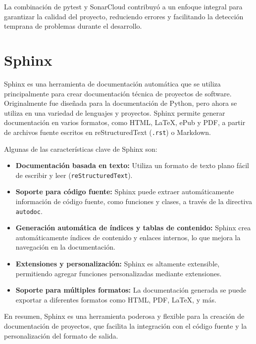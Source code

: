 La combinación de pytest y SonarCloud contribuyó a un enfoque integral para garantizar la calidad del proyecto, reduciendo errores y facilitando la detección temprana de problemas durante el desarrollo.

\section*{Sphinx}

Sphinx es una herramienta de documentación automática que se utiliza principalmente para crear documentación técnica de proyectos de software. Originalmente fue diseñada para la documentación de Python, pero ahora se utiliza en una variedad de lenguajes y proyectos. Sphinx permite generar documentación en varios formatos, como HTML, LaTeX, ePub y PDF, a partir de archivos fuente escritos en reStructuredText (\texttt{.rst}) o Markdown.

Algunas de las características clave de Sphinx son:

\begin{itemize}
    \item \textbf{Documentación basada en texto:} Utiliza un formato de texto plano fácil de escribir y leer (\texttt{reStructuredText}).
    \item \textbf{Soporte para código fuente:} Sphinx puede extraer automáticamente información de código fuente, como funciones y clases, a través de la directiva \texttt{autodoc}.
    \item \textbf{Generación automática de índices y tablas de contenido:} Sphinx crea automáticamente índices de contenido y enlaces internos, lo que mejora la navegación en la documentación.
    \item \textbf{Extensiones y personalización:} Sphinx es altamente extensible, permitiendo agregar funciones personalizadas mediante extensiones.
    \item \textbf{Soporte para múltiples formatos:} La documentación generada se puede exportar a diferentes formatos como HTML, PDF, LaTeX, y más.
\end{itemize}

En resumen, Sphinx es una herramienta poderosa y flexible para la creación de documentación de proyectos, que facilita la integración con el código fuente y la personalización del formato de salida.





